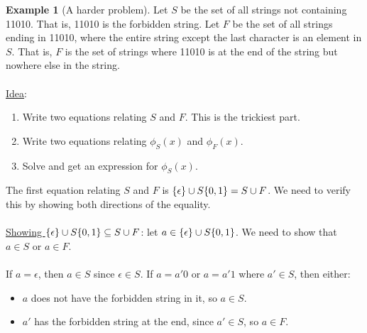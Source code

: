 \documentclass[]{article}
\theoremstyle{definition}
\newtheorem{ex}{Example}[section]
\DeclarePairedDelimiter{\set}{\lbrace}{\rbrace}
\begin{document}
				\begin{ex}[A harder problem]
					Let $S$ be the set of all strings not containing 11010. That is, 11010 is the forbidden string. Let $F$ be the set of all strings ending in 11010, where the entire string except the last character is an element in $S$. That is, $F$ is the set of strings where 11010 is at the end of the string but nowhere else in the string.
					\\ \\
					\underline{Idea}:
					\begin{enumerate}
						\item Write two equations relating $S$ and $F$. This is the trickiest part.
						\item Write two equations relating $\phi_S(x)$ and $\phi_F(x)$.
						\item Solve and get an expression for $\phi_S(x)$.
					\end{enumerate}

					The first equation relating $S$ and $F$ is $\set{\epsilon } \cup S \set{0, 1 } = S \cup F$. We need to verify this by showing both directions of the equality.
					\\ \\
					\underline{Showing $\set{\epsilon } \cup S \set{0, 1 } \subseteq S \cup F$}: let $a \in \set{\epsilon } \cup S \set{0, 1 }$. We need to show that $a \in S$ or $a \in F$.
					\\ \\
					If $a = \epsilon$, then $a \in S$ since $\epsilon \in S$. If $a = a'0$ or $a = a'1$ where $a' \in S$, then either:
					\begin{itemize}
						\item $a$ does not have the forbidden string in it, so $a \in S$.
						\item $a'$ has the forbidden string at the end, since $a' \in S$, so $a \in F$.
					\end{itemize}


\end{ex}
\end{document}
